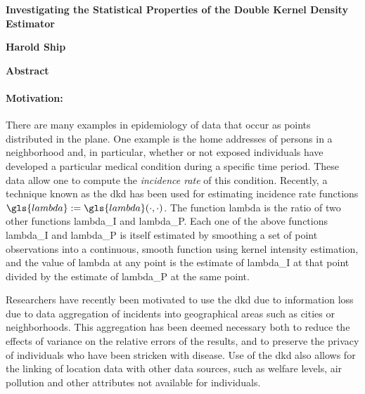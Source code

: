 


\begin{onehalfspace}

\begin{center}
    \vspace*{0.5cm}

    \textbf{\Large Investigating the Statistical Properties of the Double Kernel Density Estimator}

    \vspace*{1.0cm}

    \textbf{Harold Ship}

    \vspace*{1.0cm}

\end{center}

\noindent\textbf{\LARGE Abstract}

\paragraph*{Motivation:}

There are many examples in epidemiology of data that occur as points distributed in the plane.
One example is
the home addresses of persons in a neighborhood and,
in particular,
whether or not exposed individuals have developed a particular medical condition during a specific time period.
These data allow one to compute the \textit{incidence rate} of this condition.
Recently, a technique known as the \acrlong{dkd} has been used for estimating \acrlong{incidence rate} functions
$\gls{lambda} := \gls{lambda}\dotdot$.
The function \gls{lambda} is the ratio of two other functions \gls{lambda_I} and \gls{lambda_P}.
Each one of the above functions \gls{lambda_I} and \gls{lambda_P}
is itself estimated by smoothing a set of point observations into a continuous,
smooth function using \gls{kernel intensity estimation},
and the value of \gls{lambda} at any point is the estimate of \gls{lambda_I} at that point
divided by the estimate of \gls{lambda_P} at the same point.

Researchers have recently been motivated to use the \acrlong{dkd} due to information loss due to data aggregation of incidents into geographical areas such as cities or neighborhoods.
This aggregation has been deemed necessary both
to reduce the effects of variance on the relative errors of the results,
and to preserve the privacy of individuals who have been stricken with disease.
Use of the \acrlong{dkd} also allows for the linking of location data with other data sources,
such as welfare levels, air pollution and other attributes not available for individuals.


\end{onehalfspace}
